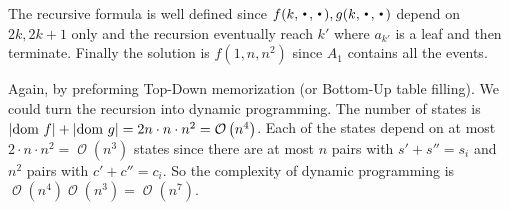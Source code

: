 \documentclass[12pt, a4paper]{article}
\DeclarePairedDelimiter{\abs}{\lvert}{\rvert}
\DeclareMathOperator*{\Bigcdot}{\scalerel*{\cdot}{\bigodot}}
\newcommand{\opord}{\operatorname{\mathcal{O}}}
\newcommand{\ord}[1]{\opord\left(#1\right)}
\begin{document}
\begin{enumerate}
    The recursive formula is well defined since $f(k, \Bigcdot, \Bigcdot), g(k, \Bigcdot, \Bigcdot)$ 
    depend on $2k, 2k+1$ only and the 
    recursion eventually reach $k'$ where $a_{k'}$ is a leaf and then terminate. 
    Finally the solution is $f(1, n, n^2)$ since $A_1$ contains all the events.

    Again, by preforming Top-Down memorization (or Bottom-Up table filling). We could turn the
    recursion into dynamic programming. The number of states is $\abs{\text{dom } f} + \abs{\text{dom } g} 
    = 2n \cdot n \cdot n^2 = \ord{n^4}$.
    Each of the states depend on at most $2 \cdot n \cdot n^2 = \ord{n^3}$ states since there are at most
    $n$ pairs with $s' + s'' = s_i$ and $n^2$ pairs with $c' + c'' = c_i$. So the complexity of
    dynamic programming is $\ord{n^4} \ord{n^3} = \ord{n^7}$.

\end{enumerate}
\end{document}

